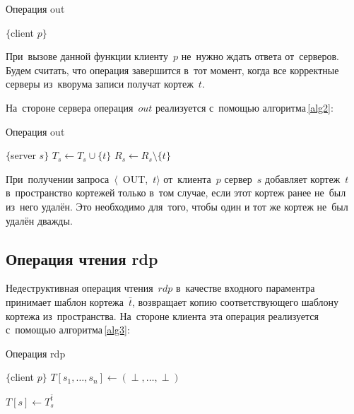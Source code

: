 \begin{algorithm}[H]
	\caption{Операция out}\label{alg1}
	\begin{algorithmic}[1]
		\Statex $\{$client $p \}$
			\State {}
		\EndFor
		\EndProcedure
	\end{algorithmic}
\end{algorithm}

При~вызове данной функции клиенту~$p$ не~нужно ждать ответа от~серверов. Будем считать, что операция завершится в~тот момент, когда все корректные серверы из~кворума записи получат кортеж~$t$.

На~стороне сервера операция~$out$ реализуется с~помощью алгоритма\,\ref{alg2}:
	
\begin{algorithm}[H]
	\caption{Операция out}\label{alg2}
	\begin{algorithmic}[1]
		\Statex $\{$server $s \}$
				\State $T_s \gets T_s \cup \{t\}$
			\EndIf
			\State $R_s \gets R_s \setminus \{t\}$
		\EndUpon
	\end{algorithmic}
\end{algorithm}

При~получении запроса~$\langle$~OUT,~$t \rangle$ от~клиента~$p$ сервер~$s$ добавляет кортеж~$t$ в~пространство кортежей только в~том случае, если этот кортеж ранее не~был из~него удалён. Это необходимо для~того, чтобы один и тот же кортеж не~был удалён дважды.

\subsection{Операция чтения rdp}\label{subsec5:2}
Недеструктивная операция чтения~$rdp$ в~качестве входного параментра принимает шаблон кортежа~$\bar t$, возвращает копию соответствующего шаблону кортежа из~пространства. На~стороне клиента эта операция реализуется с~помощью алгоритма\,\ref{alg3}:

\begin{algorithm}[H]
	\caption{Операция rdp}\label{alg3}
	\begin{algorithmic}[1]
		\Statex $\{$client $p \}$
		\State $T[s_1, \dots, s_n] \gets (\perp, \dots, \perp)$
		
		\State {}
		\EndFor
		
		\Repeat
		\State {}
		\State $T[s] \gets T_s^{\bar t}$
		
		\State {}
		\EndIf
		\State \Return{$\perp$}
		\EndFunction
	\end{algorithmic}
\end{algorithm}


